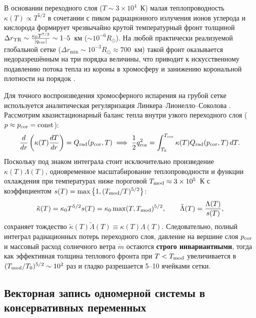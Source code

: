\documentclass[11pt,a4paper]{article}
\begin{document}
В основании переходного слоя ($T \sim 3\times 10^4$~К) малая теплопроводность $\kappa(T) \propto T^{5/2}$ в сочетании с пиком радиационного излучения ионов углерода и кислорода формирует чрезвычайно крутой температурный фронт толщиной $\Delta r_{\rm TR} \sim \frac{\kappa_0 T^{7/2}}{|q_{\rm cor}|} \sim 1\text{--}5$~км ($\sim 10^{-6} R_\odot$). На любой практически реализуемой глобальной сетке ($\Delta r_{\min} \sim 10^{-3} R_\odot \approx 700$~км) такой фронт оказывается недоразрешённым на три порядка величины, что приводит к искусственному подавлению потока тепла из короны в хромосферу и занижению корональной плотности на порядок \cite{Lionello2009}.

Для точного воспроизведения хромосферного испарения на грубой сетке используется аналитическая регуляризация Линкера--Лионелло--Соколова \cite{Lionello2009,Sokolov2013}. Рассмотрим квазистационарный баланс тепла внутри узкого переходного слоя ($p \approx p_{\rm cor} = \mathrm{const}$):
\[
\frac{d}{dr}\left(\kappa(T)\frac{dT}{dr}\right) = Q_{\rm rad}(p_{\rm cor}, T) \implies \frac{1}{2}q_{\rm cor}^2 = \int_{T_0}^{T_{\rm cor}}\kappa(T)Q_{\rm rad}(p_{\rm cor}, T)\,dT.
\]
Поскольку под знаком интеграла стоит исключительно произведение $\kappa(T)\Lambda(T)$, одновременное масштабирование теплопроводности и функции охлаждения при температурах ниже пороговой $T_{\rm mod} \approx 3\times 10^5$~К с коэффициентом $s(T) = \max\left\{1, (T_{\rm mod}/T)^{5/2}\right\}$:
\begin{equation}
\tilde{\kappa}(T) = \kappa_0 T^{5/2} s(T) = \kappa_0\max(T, T_{\rm mod})^{5/2}, \qquad
\tilde{\Lambda}(T) = \frac{\Lambda(T)}{s(T)},
\label{eq:lls_broadening}
\end{equation}
сохраняет тождество $\tilde{\kappa}(T)\tilde{\Lambda}(T) \equiv \kappa(T)\Lambda(T)$. Следовательно, полный интеграл радиационных потерь переходного слоя, давление на вершине слоя $p_{\rm cor}$ и массовый расход солнечного ветра $\dot{m}$ остаются \textbf{строго инвариантными}, тогда как эффективная толщина теплового фронта при $T < T_{\rm mod}$ увеличивается в $(T_{\rm mod}/T_0)^{5/2} \sim 10^2$ раз и гладко разрешается 5--10 ячейками сетки.

\subsection{Векторная запись одномерной системы в консервативных переменных}
\end{document}
